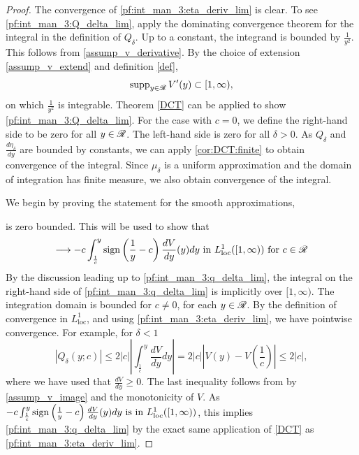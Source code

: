 {{\begin{proof}
	The convergence of \eqref{pf:int_man_3:eta_deriv_lim} is clear. To see \eqref{pf:int_man_3:Q_delta_lim}, apply the dominating convergence theorem for the integral in the definition of $Q_\delta$. Up to a constant, the integrand is bounded by $\frac{1}{y^2}$. This follows from \eqref{assump_v_derivative}. By the choice of extension \eqref{assump_v_extend} and definition \eqref{def},
	\begin{equation}
		\operatorname{supp}_{y \in\mathscr{R}} V'(y) \subset [1, \infty),
	\end{equation}
	on which $\frac{1}{y^2}$ is integrable. Theorem \eqref{DCT} can be applied to show \eqref{pf:int_man_3:Q_delta_lim}. For the case with $c = 0$, we define the right-hand side to be zero for all $y \in \mathscr{R}$. The left-hand side is zero for all $\delta > 0$. As $Q_\delta$ and $\frac{d\eta_\delta}{dy}$ are bounded by constants, we can apply \eqref{cor:DCT:finite} to obtain convergence of the integral. Since $\mu_\delta$ is a uniform approximation and the domain of integration has finite measure, we also obtain convergence of the integral. 
	
	We begin by proving the statement for the smooth approximations, 
	
	 
	\iffalse
	is zero bounded. This will be used to show that 
	\begin{equation} \label{pf:int_man_3:q_delta_lim}
		 \longrightarrow -c \int_{\frac{1}{c}}^y \operatorname{sign}\left(\frac{1}{y} - c\right) \frac{dV}{dy}(y) dy \text{ in } L^1_{\text{loc}}([1,\infty)) \text{ for } c \in \mathscr{R}
	\end{equation} 
	By the discussion leading up to \eqref{pf:int_man_3:q_delta_lim}, the integral on the right-hand side of \eqref{pf:int_man_3:q_delta_lim} is implicitly over $[1,\infty)$. The integration domain is bounded for $c \neq 0$, for each $y \in \mathscr{R}$. By the definition of convergence in $L^1_\text{loc}$, and using \eqref{pf:int_man_3:eta_deriv_lim}, we have pointwise convergence. For example, for $\delta < 1$
	\begin{equation}
		\left|Q_\delta(y;c)\right| \leq 2 \left|c\right| \left|\int_{\frac{1}{c}}^y \frac{dV}{dy} dy \right|= 2 \left|c\right| \left|V(y) - V(\frac{1}{c})\right| \leq 2 \left|c\right|, 
	\end{equation}
	where we have used that $\frac{dV}{dy} \geq 0$. The last inequality follows from by \eqref{assump_v_image} and the monotonicity of $V$. As $-c \int_{\frac{1}{c}}^y \operatorname{sign}\left(\frac{1}{y} - c\right) \frac{dV}{dy}(y) dy \text{ is in } L^1_{\text{loc}}([1,\infty))$, this implies \eqref{pf:int_man_3:q_delta_lim} by the exact same application of \eqref{DCT} as \eqref{pf:int_man_3:eta_deriv_lim}. 
	

\end{proof}}}
